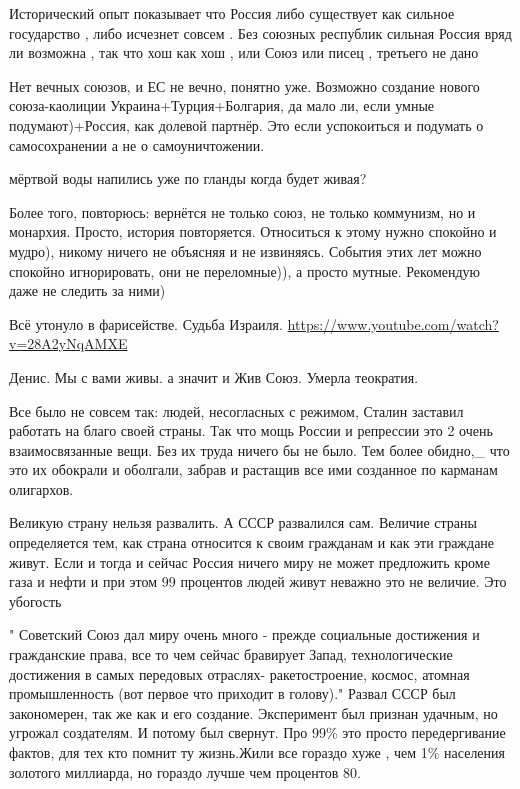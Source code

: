 \begin{itemize}

Исторический опыт показывает что Россия либо существует как сильное государство
, либо исчезнет совсем . Без союзных республик сильная Россия вряд ли возможна
, так что хош как хош , или Союз или писец , третьего не дано

\begin{itemize} %

Нет вечных союзов, и ЕС не вечно, понятно уже. Возможно создание нового
союза-каолиции Украина+Турция+Болгария, да мало ли, если умные подумают)+Россия,
как долевой партнёр. Это если успокоиться и подумать о самосохранении а не о
самоуничтожении.

\end{itemize} %

мёртвой воды напились уже по гланды
когда будет живая?


Более того, повторюсь: вернётся не только союз, не только коммунизм, но и
монархия. Просто, история повторяется. Относиться к этому нужно спокойно и
мудро), никому ничего не объясняя и не извиняясь. События этих лет можно
спокойно игнорировать, они не переломные)), а просто мутные. Рекомендую даже не
следить за ними)


Всё утонуло в фарисействе. Судьба Израиля. \url{https://www.youtube.com/watch?v=28A2yNqAMXE}

Денис. Мы с вами живы. а значит и Жив Союз. Умерла теократия.


Все было не совсем так: людей, несогласных с режимом, Сталин заставил работать
на благо своей страны. Так что мощь России и репрессии это 2 очень
взаимосвязанные вещи. Без их труда ничего бы не было. Тем более обидно,_ что
это их обокрали и оболгали, забрав и растащив все ими созданное по карманам
олигархов.



Великую страну нельзя развалить. А СССР развалился сам. Величие страны
определяется тем, как страна относится к своим гражданам и как эти граждане
живут. Если и тогда и сейчас Россия ничего миру не может предложить кроме газа
и нефти и при этом 99 процентов людей живут неважно это не величие. Это
убогость


" Советский Союз дал миру очень много - прежде социальные достижения и
гражданские права, все то чем сейчас бравирует Запад, технологические
достижения в самых передовых отраслях- ракетостроение, космос, атомная
промышленность (вот первое что приходит в голову)." Развал СССР был
закономерен, так же как и его создание. Эксперимент был признан удачным, но
угрожал создателям. И потому был свернут. Про 99\% это просто передергивание
фактов, для тех кто помнит ту жизнь.Жили все гораздо хуже , чем 1\% населения
золотого миллиарда, но гораздо лучше чем процентов 80.


\end{itemize}
